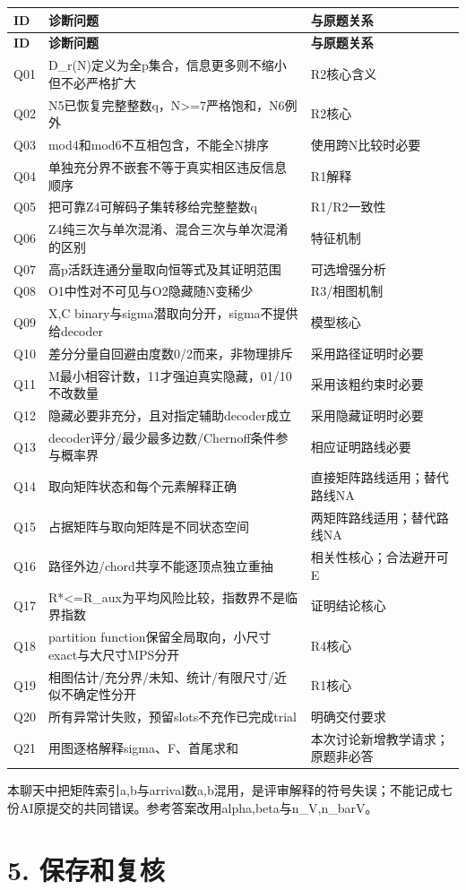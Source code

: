 \documentclass[11pt,a4paper]{article}
\begin{document}
{\fontsize{9}{12.5}\selectfont
\setlength{\tabcolsep}{2.2pt}

\begin{longtable}{>{\raggedright\arraybackslash}p{}>{\raggedright\arraybackslash}p{}>{\raggedright\arraybackslash}p{}}
\toprule
\textbf{ID} & \textbf{诊断问题} & \textbf{与原题关系}\tabularnewline
\midrule
\endfirsthead
\toprule
\textbf{ID} & \textbf{诊断问题} & \textbf{与原题关系}\tabularnewline
\midrule
\endhead
{}Q01 & D\_r(N)定义为全p集合，信息更多则不缩小但不必严格扩大 & R2核心含义\tabularnewline
{}Q02 & N5已恢复完整整数q，N>=7严格饱和，N6例外 & R2核心\tabularnewline
{}Q03 & mod4和mod6不互相包含，不能全N排序 & 使用跨N比较时必要\tabularnewline
{}Q04 & 单独充分界不嵌套不等于真实相区违反信息顺序 & R1解释\tabularnewline
{}Q05 & 把可靠Z4可解码子集转移给完整整数q & R1/R2一致性\tabularnewline
{}Q06 & Z4纯三次与单次混淆、混合三次与单次混淆的区别 & 特征机制\tabularnewline
{}Q07 & 高p活跃连通分量取向恒等式及其证明范围 & 可选增强分析\tabularnewline
{}Q08 & O1中性对不可见与O2隐藏随N变稀少 & R3/相图机制\tabularnewline
{}Q09 & X,C binary与sigma潜取向分开，sigma不提供给decoder & 模型核心\tabularnewline
{}Q10 & 差分分量自回避由度数0/2而来，非物理排斥 & 采用路径证明时必要\tabularnewline
{}Q11 & M最小相容计数，11才强迫真实隐藏，01/10不改数量 & 采用该粗约束时必要\tabularnewline
{}Q12 & 隐藏必要非充分，且对指定辅助decoder成立 & 采用隐藏证明时必要\tabularnewline
{}Q13 & decoder评分/最少最多边数/Chernoff条件参与概率界 & 相应证明路线必要\tabularnewline
{}Q14 & 取向矩阵状态和每个元素解释正确 & 直接矩阵路线适用；替代路线NA\tabularnewline
{}Q15 & 占据矩阵与取向矩阵是不同状态空间 & 两矩阵路线适用；替代路线NA\tabularnewline
{}Q16 & 路径外边/chord共享不能逐顶点独立重抽 & 相关性核心；合法避开可E\tabularnewline
{}Q17 & R*<=R\_aux为平均风险比较，指数界不是临界指数 & 证明结论核心\tabularnewline
{}Q18 & partition function保留全局取向，小尺寸exact与大尺寸MPS分开 & R4核心\tabularnewline
{}Q19 & 相图估计/充分界/未知、统计/有限尺寸/近似不确定性分开 & R1核心\tabularnewline
{}Q20 & 所有异常计失败，预留slots不充作已完成trial & 明确交付要求\tabularnewline
{}Q21 & 用图逐格解释sigma、F、首尾求和 & 本次讨论新增教学请求；原题非必答\tabularnewline
\bottomrule
\end{longtable}
}

本聊天中把矩阵索引a,b与arrival数a,b混用，是评审解释的符号失误；不能记成七份AI原提交的共同错误。参考答案改用alpha,beta与n\_V,n\_barV。

\section*{5. 保存和复核}
\end{document}
